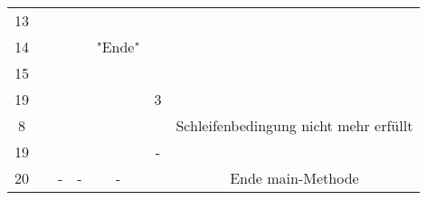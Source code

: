 \documentclass{scrartcl}
\begin{document}
\begin{center}
\begin{tabular}{ccccccc}
			&	&						&						&				&	& \\ %
	\midrule
	13		&	&						&						&				&	& \\
	14		&	&						&						& "{}Ende"		&	& \\
	15		&	&						&						&				&	& \\
	19		&	&						&						&				& 3	& \\
	8		&	&						&						&				&	& Schleifenbedingung nicht mehr erfüllt\\
	19		&	&						&						&				& -	& \\
	20		&	& -						& -						& -				& 	& Ende main-Methode\\
	\bottomrule
\end{tabular}
\end{center}
\end{document}
